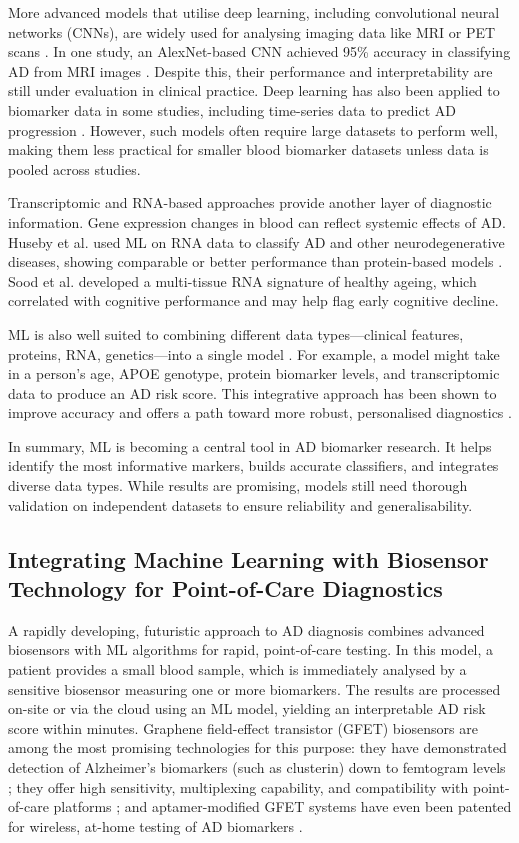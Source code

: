 \documentclass[a4paper,12pt]{article}
\begin{document}
More advanced models that utilise deep learning, including convolutional neural networks (CNNs), are widely used for analysing imaging data like MRI or PET scans \cite{malik2024deep}. In one study, an AlexNet-based CNN achieved 95\% accuracy in classifying AD from MRI images \cite{el2024novel}. Despite this, their performance and interpretability are still under evaluation in clinical practice. Deep learning has also been applied to biomarker data in some studies, including time-series data to predict AD progression \cite{nguyen2020predicting}. However, such models often require large datasets to perform well, making them less practical for smaller blood biomarker datasets unless data is pooled across studies.

Transcriptomic and RNA-based approaches provide another layer of diagnostic information. Gene expression changes in blood can reflect systemic effects of AD. Huseby et al. used ML on RNA data to classify AD and other neurodegenerative diseases, showing comparable or better performance than protein-based models \cite{huseby2022blood}. Sood et al. \cite{sood2015novel} developed a multi-tissue RNA signature of healthy ageing, which correlated with cognitive performance and may help flag early cognitive decline.

ML is also well suited to combining different data types—clinical features, proteins, RNA, genetics—into a single model \cite{li2021applied,ren2025artificial}. For example, a model might take in a person’s age, APOE genotype, protein biomarker levels, and transcriptomic data to produce an AD risk score. This integrative approach has been shown to improve accuracy and offers a path toward more robust, personalised diagnostics \cite{huseby2022blood}.

In summary, ML is becoming a central tool in AD biomarker research. It helps identify the most informative markers, builds accurate classifiers, and integrates diverse data types. While results are promising, models still need thorough validation on independent datasets to ensure reliability and generalisability.


\subsection{Integrating Machine Learning with Biosensor Technology for Point-of-Care Diagnostics}
A rapidly developing, futuristic approach to AD diagnosis combines advanced biosensors with ML algorithms for rapid, point-of-care testing.  In this model, a patient provides a small blood sample, which is immediately analysed by a sensitive biosensor measuring one or more biomarkers. The results are processed on-site or via the cloud using an ML model, yielding an interpretable AD risk score within minutes. Graphene field-effect transistor (GFET) biosensors are among the most promising technologies for this purpose: they have demonstrated detection of Alzheimer’s biomarkers (such as clusterin) down to femtogram levels \cite{bungon2021graphene}; they offer high sensitivity, multiplexing capability, and compatibility with point-of-care platforms \cite{krishnan2023graphene}; and aptamer-modified GFET systems have even been patented for wireless, at-home testing of AD biomarkers \cite{ono2024challenges}.
\end{document}
